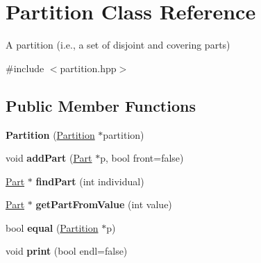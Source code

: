 \hypertarget{class_partition}{\section{Partition Class Reference}
\label{class_partition}
}


A partition (i.\-e., a set of disjoint and covering parts)  




{\ttfamily \#include $<$partition.\-hpp$>$}

\subsection*{Public Member Functions}
\begin{DoxyCompactItemize}
\item 
\hypertarget{class_partition_acb291b3b0ccf48005e141be32fdd7efd}{{\bfseries Partition} (\hyperlink{class_partition}{Partition} $\ast$partition)}\label{class_partition_acb291b3b0ccf48005e141be32fdd7efd}

\item 
\hypertarget{class_partition_a63f82a3a75dc0c3d0d27766b2459c9fe}{void {\bfseries add\-Part} (\hyperlink{class_part}{Part} $\ast$p, bool front=false)}\label{class_partition_a63f82a3a75dc0c3d0d27766b2459c9fe}

\item 
\hypertarget{class_partition_ae21fdef95c1f37a6a677ac145f29b119}{\hyperlink{class_part}{Part} $\ast$ {\bfseries find\-Part} (int individual)}\label{class_partition_ae21fdef95c1f37a6a677ac145f29b119}

\item 
\hypertarget{class_partition_a76ac69e01cafef5af0fef2e917e6fdf1}{\hyperlink{class_part}{Part} $\ast$ {\bfseries get\-Part\-From\-Value} (int value)}\label{class_partition_a76ac69e01cafef5af0fef2e917e6fdf1}

\item 
\hypertarget{class_partition_abced08b339e293866a614b2f21414375}{bool {\bfseries equal} (\hyperlink{class_partition}{Partition} $\ast$p)}\label{class_partition_abced08b339e293866a614b2f21414375}

\item 
\hypertarget{class_partition_a3463b34ab90d020ed40635c473301a64}{void {\bfseries print} (bool endl=false)}\label{class_partition_a3463b34ab90d020ed40635c473301a64}

\end{DoxyCompactItemize}
